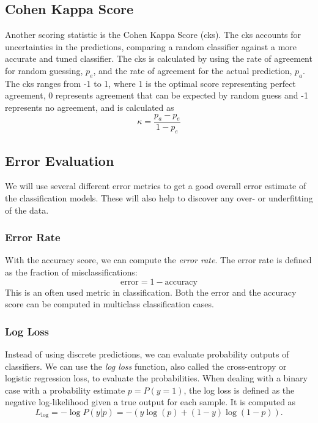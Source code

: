\documentclass[a4paper, american, 12pt]{report}
\begin{document}
	\subsection{Cohen Kappa Score}
	\label{subsect:Theory-CKS}
	Another scoring statistic is the Cohen Kappa Score (\acrshort{cks})\cite{cks}. The \acrshort{cks} accounts for uncertainties in the predictions, comparing a random classifier against a more accurate and tuned classifier. The \acrshort{cks} is calculated by using the rate of agreement for random guessing, $p_e$, and the rate of agreement for the actual prediction, $p_a$. The \acrshort{cks} ranges from -1 to 1, where 1 is the optimal score representing perfect agreement, 0 represents agreement that can be expected by random guess and -1 represents no agreement, and is calculated as 
	\begin{equation}
	\label{eq:CohenKappa}
		\kappa=\frac{p_a-p_e}{1-p_e}
	\end{equation}
	
	
	\subsection{Error Evaluation}
	\label{subsect:Theory-ErrorEval}
	We will use several different error metrics to get a good overall error estimate of the classification models. These will also help to discover any over- or underfitting of the data.
	
	
	\subsubsection{Error Rate}
	\label{subsubsect:Theory-ErrorRate}
	With the accuracy score, we can compute the \textit{error rate}. The error rate is defined as the fraction of misclassifications:
	\begin{equation}
	\label{eq:error}
		\text{error} = 1 - \text{accuracy}
	\end{equation}
	This is an often used metric in classification. Both the error and the accuracy score can be computed in multiclass classification cases.
	
	
	\subsubsection{Log Loss}
	\label{subsubsect:Theory-LogLoss}
	Instead of using discrete predictions, we can evaluate probability outputs of classifiers. We can use the \textit{log loss} function, also called the cross-entropy or logistic regression loss, to evaluate the probabilities. When dealing with a binary case with a probability estimate $p=P(y=1)$, the log loss is defined as the negative log-likelihood given a true output for each sample. It is computed as
	\begin{equation}
	\label{eq:LogLossBin}
		L_{\text{log}} = -\log P(y|p)=-(y\log (p) + (1-y)\log(1-p)).
	\end{equation}
	
\end{document}
